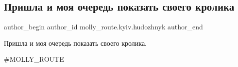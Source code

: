  
 
 
 
 

\subsection{Пришла и моя очередь показать своего кролика}
\label{sec:16_04_2018.fb.molly_route.kyiv.hudozhnyk.1.prishla_i_moja_ochered_pokazat_svoego_krolika}

\ifcmt
 author_begin
   author_id molly_route.kyiv.hudozhnyk
 author_end
\fi

Пришла и моя очередь показать своего кролика. 

\#MOLLY\_ROUTE

